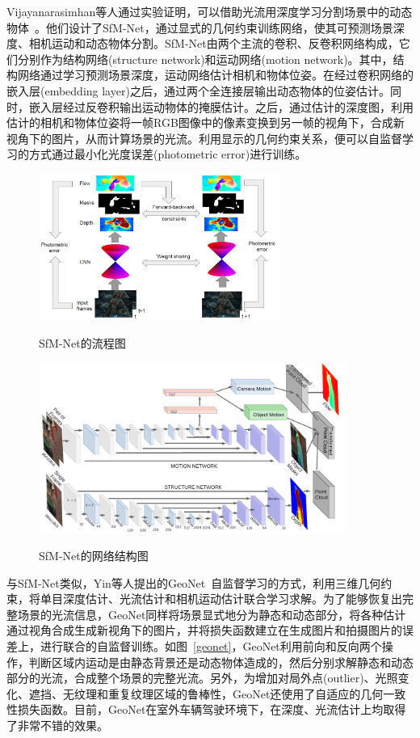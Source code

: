Vijayanarasimhan等人通过实验证明，可以借助光流用深度学习分割场景中的动态物体~\cite{2017sfm}。他们设计了SfM-Net，通过显式的几何约束训练网络，使其可预测场景深度、相机运动和动态物体分割。SfM-Net由两个主流的卷积、反卷积网络构成，它们分别作为结构网络(structure network)和运动网络(motion network)。其中，结构网络通过学习预测场景深度，运动网络估计相机和物体位姿。在经过卷积网络的嵌入层(embedding layer)之后，通过两个全连接层输出动态物体的位姿估计。同时，嵌入层经过反卷积输出运动物体的掩膜估计。之后，通过估计的深度图，利用估计的相机和物体位姿将一帧RGB图像中的像素变换到另一帧的视角下，合成新视角下的图片，从而计算场景的光流。利用显示的几何约束关系，便可以自监督学习的方式通过最小化光度误差(photometric error)进行训练。

\begin{figure}[htbp]
	\centering
	\includegraphics[width=0.7\textwidth]{figs/1-2/sfm-net.png} 
	\label{sfm-net}
	\caption{SfM-Net的流程图}
\end{figure}

\begin{figure}[htbp]
	\centering
	\includegraphics[width=0.9\textwidth]{figs/1-2/sfm-net2.png} 
	\label{sfm-net2}
	\caption{SfM-Net的网络结构图}
\end{figure}

与SfM-Net类似，Yin等人提出的GeoNet~\cite{geonet}自监督学习的方式，利用三维几何约束，将单目深度估计、光流估计和相机运动估计联合学习求解。为了能够恢复出完整场景的光流信息，GeoNet同样将场景显式地分为静态和动态部分，将各种估计通过视角合成生成新视角下的图片，并将损失函数建立在生成图片和拍摄图片的误差上，进行联合的自监督训练。如图~\ref{geonet}，GeoNet利用前向和反向两个操作，判断区域内运动是由静态背景还是动态物体造成的，然后分别求解静态和动态部分的光流，合成整个场景的完整光流。另外，为增加对局外点(outlier)、光照变化、遮挡、无纹理和重复纹理区域的鲁棒性，GeoNet还使用了自适应的几何一致性损失函数。目前，GeoNet在室外车辆驾驶环境下，在深度、光流估计上均取得了非常不错的效果。

